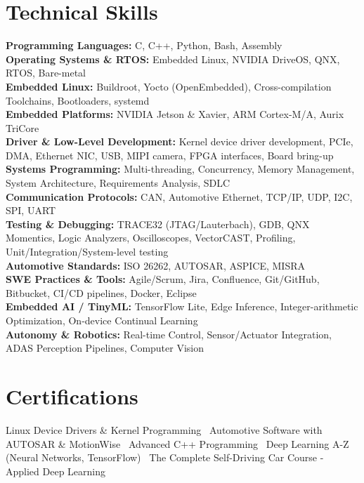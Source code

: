 \documentclass[10pt,letterpaper]{article}
\begin{document}
\section{Technical Skills}
\textbf{Programming Languages:} C, C++, Python, Bash, Assembly\\
\textbf{Operating Systems \& RTOS:} Embedded Linux, NVIDIA DriveOS, QNX, RTOS, Bare-metal\\
\textbf{Embedded Linux:} Buildroot, Yocto (OpenEmbedded), Cross-compilation Toolchains, Bootloaders, systemd\\
\textbf{Embedded Platforms:} NVIDIA Jetson \& Xavier, ARM Cortex-M/A, Aurix TriCore\\
\textbf{Driver \& Low-Level Development:} Kernel device driver development, PCIe, DMA, Ethernet NIC, USB, MIPI camera, FPGA interfaces, Board bring-up\\
\textbf{Systems Programming:} Multi-threading, Concurrency, Memory Management, System Architecture, Requirements Analysis, SDLC\\
\textbf{Communication Protocols:} CAN, Automotive Ethernet, TCP/IP, UDP, I2C, SPI, UART\\
\textbf{Testing \& Debugging:} TRACE32 (JTAG/Lauterbach), GDB, QNX Momentics, Logic Analyzers, Oscilloscopes, VectorCAST, Profiling, Unit/Integration/System-level testing\\
\textbf{Automotive Standards:} ISO 26262, AUTOSAR, ASPICE, MISRA\\
\textbf{SWE Practices \& Tools:} Agile/Scrum, Jira, Confluence, Git/GitHub, Bitbucket, CI/CD pipelines, Docker, Eclipse\\
\textbf{Embedded AI / TinyML:} TensorFlow Lite, Edge Inference, Integer-arithmetic Optimization, On-device Continual Learning\\
\textbf{Autonomy \& Robotics:} Real-time Control, Sensor/Actuator Integration, ADAS Perception Pipelines, Computer Vision

\section{Certifications}
Linux Device Drivers \& Kernel Programming \textbullet\ Automotive Software with AUTOSAR \& MotionWise \textbullet\ Advanced C++ Programming \textbullet\ Deep Learning A-Z (Neural Networks, TensorFlow) \textbullet\ The Complete Self-Driving Car Course - Applied Deep Learning
\end{document}
